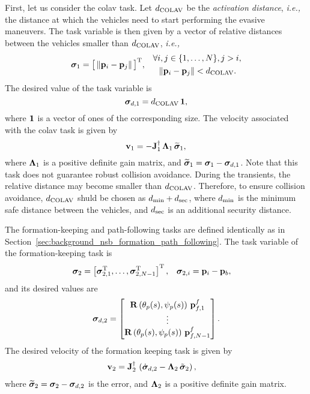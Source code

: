 First, let us consider the \gls{colav} task.
Let {$d_{\rm COLAV}$} be the \emph{activation distance}, \emph{i.e.,} the distance at which the vehicles need to start performing the evasive maneuvers.
The task variable is then given by a vector of relative distances between the vehicles smaller than $d_{\rm COLAV}$, \emph{i.e.,}
\begin{align}
        \bm{\sigma}_1 &= \big[\left\|\mathbf{p}_i - \mathbf{p}_j\right\|\big]^{\mathrm{T}}, &
        \begin{split} 
            \forall &i,j\in\{1,\ldots,N\}, j > i, \\
            &\left\|\mathbf{p}_i - \mathbf{p}_j\right\| < d_{\rm COLAV}.
        \end{split}
\end{align}
The desired value of the task variable is
\begin{equation}
    \bm{\sigma}_{d,1} = d_{\rm COLAV} \, \mathbf{1},
\end{equation}
where $\mathbf{1}$ is a vector of ones of the corresponding size.
The velocity associated with the \gls{colav} task is given by
\begin{equation}
    \mathbf{v}_{1} = - \mathbf{J}_1^{\dagger}\, \bm{\Lambda}_1\,\widetilde{\bm{\sigma}}_1,
\end{equation}
where $\bm{\Lambda}_1$ is a positive definite gain matrix, and $\widetilde{\bm{\sigma}}_1 = \bm{\sigma}_1 - \bm{\sigma}_{d,1}$.
Note that this task does not guarantee robust collision avoidance.
During the transients, the relative distance may become smaller than $d_{\rm COLAV}$.
Therefore, to ensure collision avoidance, $d_{\rm COLAV}$ shuld be chosen as $d_{\rm min} + d_{\rm sec}$, where $d_{\rm min}$ is the minimum safe distance between the vehicles, and $d_{\rm sec}$ is an additional security distance.

The formation-keeping and path-following tasks are defined identically as in Section~\ref{sec:background_nsb_formation_path_following}.
The task variable of the formation-keeping task is
\begin{align}
    \bm{\sigma}_2 &= \left[\bm{\sigma}_{2,1}^{\mathrm{T}}, \ldots, \bm{\sigma}_{2,N-1}^{\mathrm{T}}\right]^{\mathrm{T}}, \label{eq:nsb_5dof_sigma_2} &
    \bm{\sigma}_{2,i} &= \mathbf{p}_i - \mathbf{p}_b,
\end{align}
and its desired values are
\begin{equation}
    \bm{\sigma}_{d,2} = \begin{bmatrix}
        \mathbf{R}\left(\theta_p(s), \psi_p(s)\right)\,\mathbf{p}_{f,1}^f \\
        \vdots \\
        \mathbf{R}\left(\theta_p(s), \psi_p(s)\right)\,\mathbf{p}_{f,N-1}^f
    \end{bmatrix}. \label{eq:nsb_5dof_sigma_d_2}
\end{equation}
The desired velocity of the formation keeping task is given by
\begin{align}
    \mathbf{v}_{2} &= \mathbf{J}_2^{\dagger}\,\left(\dot{\bm{\sigma}}_{d,2} - \bm{\Lambda}_2\,\tilde{\bm{\sigma}}_2\right), \label{eq:nsb_5dof_CLIK}
\end{align}
where $\widetilde{\bm{\sigma}}_2 = \bm{\sigma}_2 - \bm{\sigma}_{d,2}$ is the error, and $\mathbf{\Lambda}_2$ is a positive definite gain matrix.

